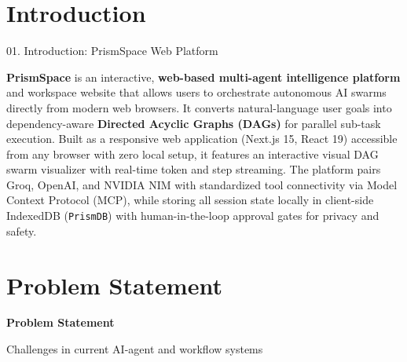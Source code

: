 \documentclass[aspectratio=169,10pt]{beamer}
\begin{document}
\section{Introduction}

\begin{frame}[c]{01. Introduction: PrismSpace Web Platform}
\centering
\begin{minipage}{0.94\linewidth}
\begin{tcolorbox}[
  enhanced, arc=5pt, colframe=lavenderDark!80, colback=lavenderLight!25,
  boxrule=0.9pt,
  left=14pt, right=14pt, top=12pt, bottom=12pt
]
\fontsize{8.6}{12.6}\selectfont\sffamily\color{lavenderDeep}
  \textbf{\fontsize{10.2}{13.0}\selectfont\color{lavenderDark}PrismSpace} is an interactive, \textbf{web-based multi-agent intelligence platform} and workspace website that allows users to orchestrate autonomous AI swarms directly from modern web browsers. It converts natural-language user goals into dependency-aware \textbf{Directed Acyclic Graphs (DAGs)} for parallel sub-task execution. Built as a responsive web application (Next.js 15, React 19) accessible from any browser with zero local setup, it features an interactive visual DAG swarm visualizer with real-time token and step streaming. The platform pairs Groq, OpenAI, and NVIDIA NIM with standardized tool connectivity via Model Context Protocol (MCP), while storing all session state locally in client-side IndexedDB (\texttt{PrismDB}) with human-in-the-loop approval gates for privacy and safety.
\end{tcolorbox}
\end{minipage}
\end{frame}


\section{Problem Statement}

\begin{frame}[plain]
\vfill
\begin{center}
  {\color{lavenderDark}\fontsize{25}{30}\selectfont\bfseries Problem Statement\par}
  \vspace{0.45em}
  {\color{prismTeal!85!black}\large Challenges in current AI-agent and workflow systems}
\end{center}
\vfill
\end{frame}
\end{document}

